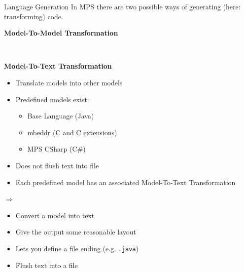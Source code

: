 	\begin{frame}{Language Generation}
		In MPS there are two possible ways of generating (here: transforming) code.\\
		
		\begin{minipage}{0.4\textwidth}
			\textbf{Model-To-Model Transformation}
		\end{minipage} 
		\begin{minipage}{0.09\textwidth}
			\Large
			\textcolor{white}{$\Rightarrow$}
		\end{minipage}
		\begin{minipage}{0.4\textwidth}
			\textbf{Model-To-Text Transformation}
		\end{minipage}
	
		\vspace*{0.5cm}
		
		\begin{minipage}{0.4\textwidth}
			\begin{itemize}
				\item Translate models into other models
				\item Predefined models exist:
				\begin{itemize}
					\item Base Language (Java)
					\item mbeddr (C and C extensions) \footnotemark[8]
					\item MPS CSharp (C\#) \footnotemark[9]
				\end{itemize}
				\item Does not flush text into file
				\item Each predefined model has an associated Model-To-Text Transformation
			\end{itemize}
		\end{minipage} 
		\begin{minipage}{0.09\textwidth}
			\Large
			$\Rightarrow$
		\end{minipage}
		\begin{minipage}{0.4\textwidth}
			\begin{itemize}
				\item Convert a model into text
				\item Give the output some reasonable layout
				\item Lets you define a file ending (e.g. \texttt{.java})
				\item Flush text into a file
			\end{itemize}
		\end{minipage}
	\end{frame}

